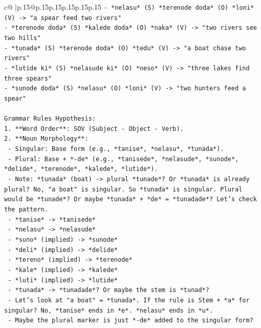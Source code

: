 \documentclass{article}
\begin{document}
{\begin{supertabular}{c@{$\;$}|p{.15\linewidth}@{}p{.15\linewidth}p{.15\linewidth}p{.15\linewidth}p{.15\linewidth}p{.15\linewidth}}
{{{\texttt{{-} *nelasu* (S) *terenode doda* (O) *loni* (V) {-}> "a spear feed two rivers"} \\
\texttt{{-} *terenode doda* (S) *kalede doda* (O) *naka* (V) {-}> "two rivers see two hills"} \\
\texttt{{-} *tunada* (S) *terenode doda* (O) *tedu* (V) {-}> "a boat chase two rivers"} \\
\texttt{{-} *lutide ki* (S) *nelasude ki* (O) *neso* (V) {-}> "three lakes find three spears"} \\
\texttt{{-} *sunode doda* (S) *nelasu* (O) *loni* (V) {-}> "two hunters feed a spear"} \\
\\ 
\texttt{Grammar Rules Hypothesis:} \\
\texttt{1.  **Word Order**: SOV (Subject {-} Object {-} Verb).} \\
\texttt{2.  **Noun Morphology**:} \\
\texttt{    {-} Singular: Base form (e.g., *tanise*, *nelasu*, *tunada*).} \\
\texttt{    {-} Plural: Base + *{-}de* (e.g., *tanisede*, *nelasude*, *sunode*, *delide*, *terenode*, *kalede*, *lutide*).} \\
\texttt{    {-} Note: *tunada* (boat) {-}> plural *tunade*? Or *tunada* is already plural? No, "a boat" is singular. So *tunada* is singular. Plural would be *tunade*? Or maybe *tunada* + *de* = *tunadade*? Let's check the pattern.} \\
\texttt{      {-} *tanise* {-}> *tanisede*} \\
\texttt{      {-} *nelasu* {-}> *nelasude*} \\
\texttt{      {-} *suno* (implied) {-}> *sunode*} \\
\texttt{      {-} *deli* (implied) {-}> *delide*} \\
\texttt{      {-} *tereno* (implied) {-}> *terenode*} \\
\texttt{      {-} *kale* (implied) {-}> *kalede*} \\
\texttt{      {-} *luti* (implied) {-}> *lutide*} \\
\texttt{      {-} *tunada* {-}> *tunadade*? Or maybe the stem is *tunad*?} \\
\texttt{      {-} Let's look at "a boat" = *tunada*. If the rule is Stem + *a* for singular? No, *tanise* ends in *e*. *nelasu* ends in *u*.} \\
\texttt{      {-} Maybe the plural marker is just *{-}de* added to the singular form?} \\
}}}
\end{supertabular}}
\end{document}
